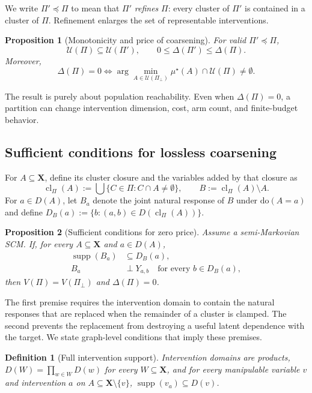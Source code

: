 \documentclass[twoside]{article}
\newtheorem{definition}{Definition}
\newtheorem{proposition}{Proposition}
\newcommand{\doo}{\mathrm{do}}
\begin{document}
We write $\Pi'\preceq\Pi$ to mean that $\Pi'$ \emph{refines} $\Pi$: every
cluster of $\Pi'$ is contained in a cluster of $\Pi$. Refinement enlarges
the set of representable interventions.

\begin{proposition}[Monotonicity and price of coarsening]
\label{prop:price}
For valid $\Pi'\preceq\Pi$,
\[
 \mathcal U(\Pi)\subseteq\mathcal U(\Pi'),
 \qquad
 0\le\Delta(\Pi')\le\Delta(\Pi).
\]
Moreover,
\[
 \Delta(\Pi)=0
 \iff
 \arg\min_{A\in\mathcal U(\Pi_\bot)}\mu^\star(A)
 \cap\mathcal U(\Pi)\ne\emptyset.
\]
\end{proposition}

The result is purely about population reachability. Even when
$\Delta(\Pi)=0$, a partition can change intervention dimension, cost, arm
count, and finite-budget behavior.

\subsection{Sufficient conditions for lossless coarsening}
\label{sec:zero-price}

For $A\subseteq\mathbf X$, define its cluster closure and the variables
added by that closure as
\[
 \operatorname{cl}_\Pi(A):=\bigcup\{C\in\Pi:C\cap A\ne\emptyset\},
 \qquad B:=\operatorname{cl}_\Pi(A)\setminus A.
\]
For $a\in D(A)$, let $B_a$ denote the joint natural response of $B$ under
$\doo(A=a)$ and define
$D_B(a):=\{b:(a,b)\in D(\operatorname{cl}_\Pi(A))\}$.

\begin{proposition}[Sufficient conditions for zero price]
\label{prop:free}
Assume a semi-Markovian SCM. If, for every $A\subseteq\mathbf X$ and
$a\in D(A)$,
\begin{align*}
 \operatorname{supp}(B_a)&\subseteq D_B(a),\\
 B_a&\perp Y_{a,b}\quad\text{for every }b\in D_B(a),
\end{align*}
then $V(\Pi)=V(\Pi_\bot)$ and $\Delta(\Pi)=0$.
\end{proposition}

The first premise requires the intervention domain to contain the natural
responses that are replaced when the remainder of a cluster is clamped. The
second prevents the replacement from destroying a useful latent dependence
with the target. We state graph-level conditions that imply these premises.

\begin{definition}[Full intervention support]
\label{def:fullsupport}
Intervention domains are products,
$D(W)=\prod_{w\in W}D(w)$ for every $W\subseteq\mathbf X$, and for every
manipulable variable $v$ and intervention $a$ on
$A\subseteq\mathbf X\setminus\{v\}$,
$\operatorname{supp}(v_a)\subseteq D(v)$.
\end{definition}
\end{document}
